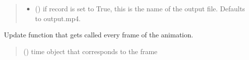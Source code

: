 \documentclass[letterpaper,10pt,english]{sphinxmanual}
\begin{document}
\begin{fulllineitems}
\begin{fulllineitems}
\begin{quote}
\begin{description}
\begin{itemize}
\item {} 
\sphinxAtStartPar
{} () \textendash{} if record is set to True, this is the name of the output file. Defaults to output.mp4.

\end{itemize}

\end{description}\end{quote}

\end{fulllineitems}


\begin{fulllineitems}
\label{\detokenize{index:sjvisualizer.Canvas.canvas.set_decimals}}
\pysigstartsignatures
{}
\pysigstopsignatures
\end{fulllineitems}


\begin{fulllineitems}
\label{\detokenize{index:sjvisualizer.Canvas.canvas.update}}
\pysigstartsignatures
{}
\pysigstopsignatures
\sphinxAtStartPar
Update function that gets called every frame of the animation.
\begin{quote}\begin{description}
\sphinxAtStartPar
{} () \textendash{} time object that corresponds to the frame

\end{description}\end{quote}

\end{fulllineitems}


\end{fulllineitems}

\end{document}

